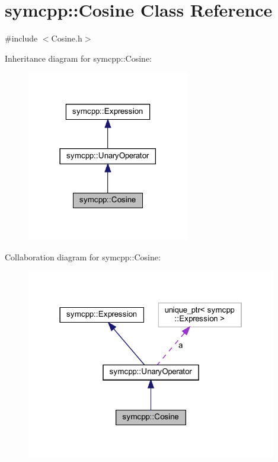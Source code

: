 \hypertarget{classsymcpp_1_1Cosine}{}\section{symcpp\+::Cosine Class Reference}
\label{classsymcpp_1_1Cosine}


{\ttfamily \#include $<$Cosine.\+h$>$}



Inheritance diagram for symcpp\+::Cosine\+:
\nopagebreak
\begin{figure}[H]
\begin{center}
\leavevmode
\includegraphics[width=201pt]{classsymcpp_1_1Cosine__inherit__graph}
\end{center}
\end{figure}


Collaboration diagram for symcpp\+::Cosine\+:
\nopagebreak
\begin{figure}[H]
\begin{center}
\leavevmode
\includegraphics[width=310pt]{classsymcpp_1_1Cosine__coll__graph}
\end{center}
\end{figure}
